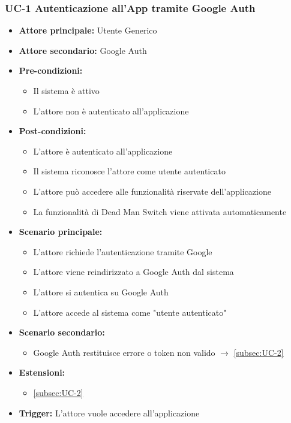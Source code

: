 \documentclass[a4paper,12pt]{article}
\begin{document}

\subsubsection{UC-1 Autenticazione all'App tramite Google Auth} \label{subsec:UC-1}


\begin{itemize}
    \item \textbf{Attore principale:} Utente Generico
    \item \textbf{Attore secondario:} Google Auth
    \item \textbf{Pre-condizioni:} 
    \begin{itemize}
        \item Il sistema è attivo
        \item L'attore non è autenticato all'applicazione
    \end{itemize}
    \item \textbf{Post-condizioni:}
    \begin{itemize}
        \item L’attore è autenticato all'applicazione
        \item Il sistema riconosce l'attore come utente autenticato
        \item L'attore può accedere alle funzionalità riservate dell'applicazione
        \item La funzionalità di Dead Man Switch viene attivata automaticamente
    \end{itemize}
    \item \textbf{Scenario principale:}
    \begin{itemize}
        \item L'attore richiede l'autenticazione tramite Google
        \item L'attore viene reindirizzato a Google Auth dal sistema
        \item L'attore si autentica su Google Auth
        \item L'attore accede al sistema come "utente autenticato"
    \end{itemize}
    \item \textbf{Scenario secondario:}
    \begin{itemize}
        \item Google Auth restituisce errore o token non valido $\rightarrow$ \ref{subsec:UC-2}
    \end{itemize} 
    \item \textbf{Estensioni:}
    \begin{itemize}
        \item \ref{subsec:UC-2}
    \end{itemize}
    \item \textbf{Trigger:} L'attore vuole accedere all'applicazione
\end{itemize}
\end{document}
